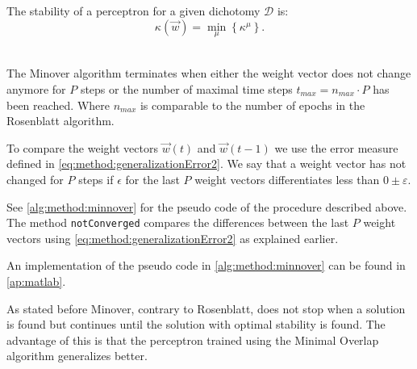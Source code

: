 The stability of a perceptron for a given dichotomy $\mathcal{D}$ is:
	\begin{equation}
		\kappa(\vec{w}) = \min_{\mu} \left\{ \kappa^\mu \right\}.
	\end{equation}

~\\The Minover algorithm terminates when either the weight vector does not change anymore for $P$ steps or the number of maximal time steps $t_{max} = n_{max} \cdot P$ has been reached. Where $n_{max}$ is comparable to the number of epochs in the Rosenblatt algorithm. 

To compare the weight vectors $\vec{w}(t)$ and $\vec{w}(t - 1)$ we use the error measure defined in \eqref{eq:method:generalizationError2}. We say that a weight vector has not changed for $P$ steps if $\epsilon$ for the last $P$ weight vectors differentiates less than $0 \pm \varepsilon$.

See \autoref{alg:method:minnover} for the pseudo code of the procedure described above. The method \texttt{notConverged} compares the differences between the last $P$ weight vectors using \eqref{eq:method:generalizationError2} as explained earlier.



An implementation of the pseudo code in \autoref{alg:method:minnover} can be found in \cref{ap:matlab}.

As stated before Minover, contrary to Rosenblatt, does not stop when a solution is found but continues until the solution with optimal stability is found. The advantage of this is that the perceptron trained using the Minimal Overlap algorithm generalizes better. 

